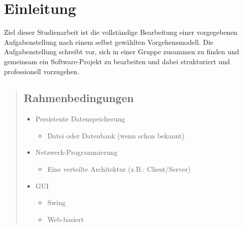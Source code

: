 \chapter{Einleitung}
Ziel dieser Studienarbeit ist die vollständige Bearbeitung einer vorgegebenen Aufgabenstellung
nach einem selbst gewählten Vorgehensmodell. Die Aufgabenstellung schreibt vor, sich in einer
Gruppe zusammen zu finden und gemeinsam ein Software-Projekt zu bearbeiten und dabei strukturiert
 und professionell vorzugehen.
\begin{quote}
    \section{Rahmenbedingungen}
    \renewcommand{\labelitemi}{•}
    \begin{itemize}
        \item Persistente Datenspeicherung
        \begin{itemize}
	    \item Datei oder Datenbank (wenn schon bekannt)
        \end{itemize}
        \item Netzwerk-Programmierung
        \begin{itemize}
	    \item Eine verteilte Architektur (z.B.: Client/Server)
        \end{itemize}
        \item GUI
        \begin{itemize}
	    \item Swing
	    \item Web-basiert
        \end{itemize}
    \end{itemize}

\end{quote}
